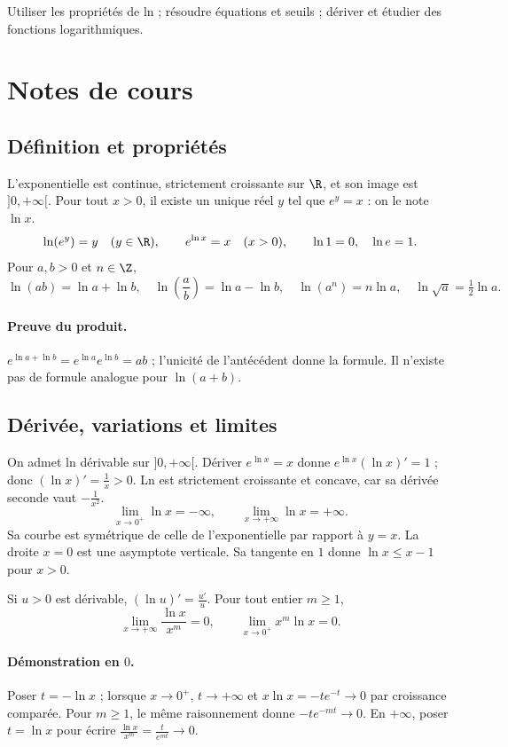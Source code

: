 \label{ch:6}


\begin{keypoint}[Objectifs]Utiliser les propriétés de ln ; résoudre équations et seuils ; dériver et étudier des fonctions logarithmiques.\end{keypoint}

\section{Notes de cours}
\subsection{Définition et propriétés}
L'exponentielle est continue, strictement croissante sur $\R$, et son image est $]0,+\infty[$. Pour tout $x>0$, il existe un unique réel $y$ tel que $e^y=x$ : on le note $\ln x$.
\[\ln(e^y)=y\quad(y\in\R),\qquad e^{\ln x}=x\quad(x>0),\qquad\ln1=0,\quad\ln e=1.\]
Pour $a,b>0$ et $n\in\Z$,
\[\ln (ab)=\ln a+\ln b,\quad\ln (\frac{a}{b})=\ln a-\ln b,\quad\ln (a^n)=n\ln a,\quad\ln \sqrt{a}=\tfrac{1}{2}\ln a.\]
\paragraph{Preuve du produit.} $e^{\ln a+\ln b}=e^{\ln a}e^{\ln b}=ab$ ; l'unicité de l'antécédent donne la formule. Il n'existe pas de formule analogue pour $\ln(a+b)$.
\subsection{Dérivée, variations et limites}
On admet ln dérivable sur $]0,+\infty[$. Dériver $e^{\ln x}=x$ donne $e^{\ln x}(\ln x)'=1$ ; donc $(\ln x)'=\frac{1}{x}>0$. Ln est strictement croissante et concave, car sa dérivée seconde vaut $-\frac{1}{x^2}$.
\[\lim_{x\to0^+}\ln x=-\infty,\qquad\lim_{x\to+\infty}\ln x=+\infty.\]
Sa courbe est symétrique de celle de l'exponentielle par rapport à $y=x$. La droite $x=0$ est une asymptote verticale. Sa tangente en $1$ donne $\ln x\le x-1$ pour $x>0$.
\begin{keypoint}
Si $u>0$ est dérivable, $(\ln u)'=\frac{u'}{u}$. Pour tout entier $m\ge1$,
\[\lim_{x\to+\infty}\frac{\ln x}{x^m}=0,\qquad\lim_{x\to0^+}x^m\ln x=0.\]
\end{keypoint}
\paragraph{Démonstration en $0$.} Poser $t=-\ln x$ ; lorsque $x\to0^+$, $t\to+\infty$ et $x\ln x=-te^{-t}\to0$ par croissance comparée. Pour $m\ge1$, le même raisonnement donne $-te^{-mt}\to0$. En $+\infty$, poser $t=\ln x$ pour écrire $\frac{\ln x}{x^m}=\frac{t}{e^{mt}}\to0$.
